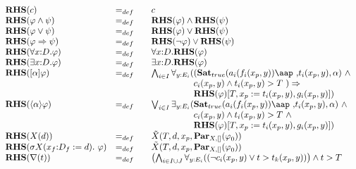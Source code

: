 \documentclass{article}
\begin{document}
\begin{equation*}
\begin{array}{lll}
{\mathbf{RHS}}(c) & =_{def} & c \\ 
{\mathbf{RHS}}(\varphi \wedge \psi ) & =_{def} & {\mathbf{RHS}}(\varphi
)\wedge {\mathbf{RHS}}(\psi ) \\ 
{\mathbf{RHS}}(\varphi \vee \psi ) & =_{def} & {\mathbf{RHS}}(\varphi )\vee {%
\mathbf{RHS}}(\psi ) \\ 
{\mathbf{RHS}}(\varphi \Rightarrow \psi ) & =_{def} & {\mathbf{RHS}}(\lnot
\varphi )\vee {\mathbf{RHS}}(\psi ) \\ 
{\mathbf{RHS}}(\forall {x{:}D}.\varphi ) & =_{def} & \forall {x{:}D}.{%
\mathbf{RHS}}(\varphi ) \\ 
{\mathbf{RHS}}(\exists {x{:}D}.\varphi ) & =_{def} & \exists {x{:}D}.{%
\mathbf{RHS}}(\varphi ) \\ 
{\mathbf{RHS}}([\alpha ]\varphi ) & =_{def} & \bigwedge_{i{\in }I}\forall _{y%
{:}E_{i}}((\mathbf{Sat}_{true}(a_{i}(f_{i}(x_{p},y))\mbox{\aap ,}%
t_{i}(x_{p},y),\alpha )\ \wedge \\ 
&  & \phantom{\bigwedge_{i {\in} I} \forall_{y {:} E_i}(}c_{i}(x_{p},y)%
\wedge t_{i}(x_{p},y)>T\ )\Rightarrow \\ 
&  & \phantom{\bigwedge_{i {\in} I} \forall_{y {:} E_i}(} {\mathbf{RHS}}%
(\varphi )[T,x_{p}:=t_{i}(x_{p},y),g_{i}(x_{p},y)]) \\ 
{\mathbf{RHS}}(\langle \alpha \rangle \varphi ) & =_{def} & \bigvee_{i{\in }%
I}\exists _{y{:}E_{i}}(\mathbf{Sat}_{true}(a_{i}(f_{i}(x_{p},y))%
\mbox{\aap
,}t_{i}(x_{p},y),\alpha )\ \wedge \\ 
&  & \phantom{\bigvee_{i {\in} I} \exists_{y {:} E_i}(}c_{i}(x_{p},y)\wedge
t_{i}(x_{p},y)>T\ \wedge \\ 
&  & \phantom{\bigvee_{i {\in} I} \exists_{y {:} E_i}(} {\mathbf{RHS}}%
(\varphi )[T,x_{p}:=t_{i}(x_{p},y),g_{i}(x_{p},y)]) \\ 
{\mathbf{RHS}}(X(d)) & =_{def} & \tilde{X}(T,d,x_{p},\mathbf{Par}%
_{X,[]}(\varphi _{0})) \\ 
{\mathbf{RHS}}(\sigma X(x_{f}{:}D_{f}:=d).~\varphi ) & =_{def}~~~ & \tilde{X}%
(T,d,x_{p},\mathbf{Par}_{X,[]}(\varphi _{0})) \\ 
{\mathbf{RHS}}(\nabla (t)) & =_{def} & \left( \bigwedge_{i{\in }I\cup
J}\forall _{y{:}E_{i}}((\lnot c_{i}(x_{p},y)\vee t>t_{k}(x_{p},y))\right)
\wedge t>T \\ 

\end{array}
\end{equation*}
\end{document}
